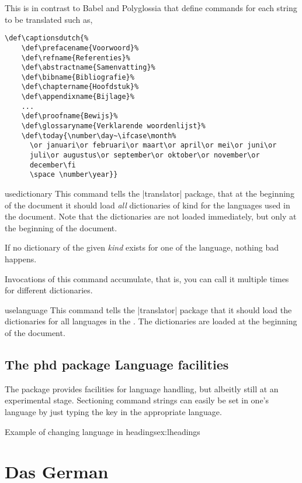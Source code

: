 This is in contrast to Babel and Polyglossia that define
commands for each string to be translated such as,

\begin{verbatim}
\def\captionsdutch{%
    \def\prefacename{Voorwoord}%
    \def\refname{Referenties}%
    \def\abstractname{Samenvatting}%
    \def\bibname{Bibliografie}%
    \def\chaptername{Hoofdstuk}%
    \def\appendixname{Bijlage}%
    ...
    \def\proofname{Bewijs}%
    \def\glossaryname{Verklarende woordenlijst}%
    \def\today{\number\day~\ifcase\month%
      \or januari\or februari\or maart\or april\or mei\or juni\or
      juli\or augustus\or september\or oktober\or november\or
      december\fi
      \space \number\year}}
\end{verbatim}

\begin{docCommand}{usedictionary}{}
  This command tells the |translator| package, that at the beginning of
  the document it should load \textit{all} dictionaries of kind  for
  the languages used in the document. Note that the dictionaries are
  not loaded immediately, but only at the beginning of the document.

  If no dictionary of the given \emph{kind} exists for one of the
  language, nothing bad happens.

  Invocations of this command accumulate, that is, you can call it
  multiple times for different dictionaries.
\end{docCommand}

\begin{docCommand}{uselanguage}{}
  This command tells the |translator| package that it should load the
  dictionaries for all languages in the . The
  dictionaries are loaded at the beginning of the document.
\end{docCommand}

\section{The phd package Language facilities}

The  package provides facilities for language handling, but albeitly still at an experimental stage. Sectioning command strings can easily be set in one's language by just typing the key in the appropriate language.

\begin{texexample}{Example of changing language in headings}{ex:lheadings}
\chapter{Das German}
\end{texexample}


